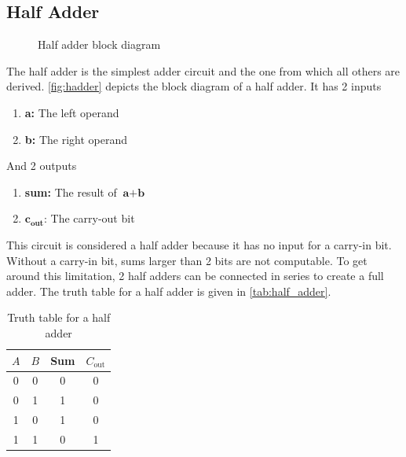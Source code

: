 \documentclass[12pt]{labmanual}
\begin{document}
\subsection{Half Adder}
\begin{figure}
    \centering
{}
    \caption{Half adder block diagram}
    \label{fig:hadder}
\end{figure}%

The half adder is the simplest adder circuit and the one from which all others are derived. \autoref{fig:hadder} depicts the block diagram of a half adder. It has 2 inputs
\begin{enumerate}
    \item \textbf{a:} The left operand
    \item \textbf{b:} The right operand
\end{enumerate}
\clearpage
And 2 outputs
\begin{enumerate}
    \item \textbf{sum:} The result of $\textbf{a} + \textbf{b}$
    \item $\textbf{c}_\textbf{out}$: The carry-out bit
\end{enumerate}%
{\setlength{\linewidth}{\textwidth}
\noindent
This circuit is considered a half adder because it has no input for a carry-in bit. Without a carry-in bit, sums larger than 2 bits are not computable. To get around this limitation, 2 half adders can be connected in series to create a full adder. The truth table for a half adder is given in \autoref{tab:half_adder}.}

\begin{table}[htpb!]
    \centering
    \begin{tabular}{cc | cc}
        \toprule
        $A$ & $B$ & Sum & $C_{\text{out}}$ \\
        \midrule
        0 & 0 & 0 & 0 \\
        0 & 1 & 1 & 0 \\
        1 & 0 & 1 & 0 \\
        1 & 1 & 0 & 1 \\
        \bottomrule
    \end{tabular}
    \caption{Truth table for a half adder}
    \label{tab:half_adder}
\end{table}
\end{document}
